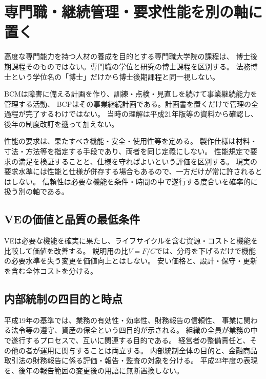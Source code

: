 \section{専門職・継続管理・要求性能を別の軸に置く}\label{theory:compliance:management}
高度な専門能力を持つ人材の養成を目的とする専門職大学院の課程は、
博士後期課程そのものではない。専門職の学位と研究の博士課程を区別する。
法務博士という学位名の「博士」だけから博士後期課程と同一視しない。\cite{eng52_professional}

BCMは障害に備える計画を作り、訓練・点検・見直しを続けて事業継続能力を管理する活動、
BCPはその事業継続計画である。計画書を置くだけで管理の全過程が完了するわけではない。
当時の理解は平成21年版等の資料から確認し、後年の制度改訂を遡って加えない。\cite{eng52_bcp}

性能の要求は、果たすべき機能・安全・使用性等を定める。
製作仕様は材料・寸法・方法等を指定する手段であり、両者を同じ定義にしない。
性能規定で要求の満足を検証することと、仕様を守ればよいという評価を区別する。
現実の要求水準には性能と仕様が併存する場合もあるので、一方だけが常に許されるとはしない。
信頼性は必要な機能を条件・時間の中で遂行する度合いを確率的に扱う別の軸である。\cite{eng52_performance}

\subsection{VEの価値と品質の最低条件}
VEは必要な機能を確実に果たし、ライフサイクルを含む資源・コストと機能を比較して価値を改善する。
説明用の比\(V=F/C\)では、分母を下げるだけで機能の必要水準を失う変更を価値向上とはしない。
安い価格と、設計・保守・更新を含む全体コストを分ける。\cite{eng52_ve}

\subsection{内部統制の四目的と時点}
平成19年の基準では、業務の有効性・効率性、財務報告の信頼性、
事業に関わる法令等の遵守、資産の保全という四目的が示される。
組織の全員が業務の中で遂行するプロセスで、互いに関連する目的である。
経営者の整備責任と、その他の者が運用に関与することは両立する。
内部統制全体の目的と、金融商品取引法の財務報告に係る評価・報告・監査の対象を分ける。\cite{eng52_control}
平成23年度の表現を、後年の報告範囲の変更後の用語に無断置換しない。
